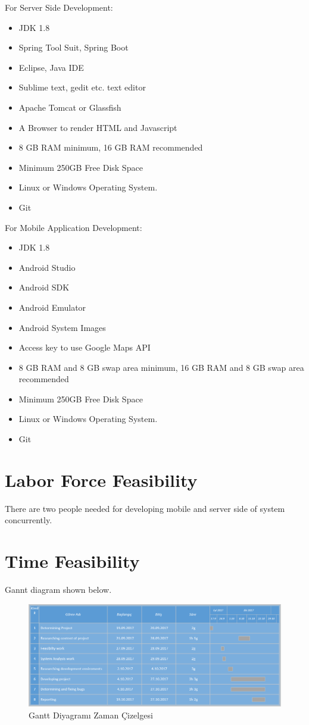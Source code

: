 For Server Side Development:
\begin{itemize}
    \item JDK 1.8
    \item Spring Tool Suit, Spring Boot
    \item Eclipse, Java IDE
    \item Sublime text, gedit etc. text editor
    \item Apache Tomcat or Glassfish
    \item A Browser to render HTML and Javascript
    \item 8 GB RAM minimum, 16 GB RAM recommended
    \item Minimum 250GB Free Disk Space    
    \item Linux or Windows Operating System.
    \item Git
    
\end{itemize}

For Mobile Application Development:
\begin{itemize}
    \item JDK 1.8
    \item Android Studio
    \item Android SDK
    \item Android Emulator
    \item Android System Images
    \item Access key to use Google Maps API
    \item 8 GB RAM and 8 GB swap area minimum, 16 GB RAM and 8 GB swap area recommended
    \item Minimum 250GB Free Disk Space
    \item Linux or Windows Operating System.
    \item Git    
\end{itemize}


\section{Labor Force Feasibility}
There are two people needed for developing mobile and server side of system concurrently.



\section{Time Feasibility}
Gannt diagram shown below.
\begin{figure}[!htbp]
\centering
\includegraphics[width=\textwidth]{projectChapters/images/gantt.png}
\caption{Gantt Diyagramı Zaman Çizelgesi}
\end{figure}



